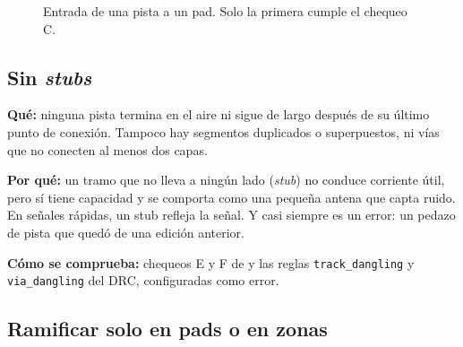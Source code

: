 \begin{figure}[htbp]
\centering
{}
\caption{Entrada de una pista a un pad. Solo la primera cumple el chequeo C.}
\label{fig:c09-entrada}
\end{figure}

\subsection{Sin \emph{stubs}}

\textbf{Qué:} ninguna pista termina en el aire ni sigue de largo después de su último punto de conexión. Tampoco hay
segmentos duplicados o superpuestos, ni vías que no conecten al menos dos capas.

\textbf{Por qué:} un tramo que no lleva a ningún lado (\emph{stub}) no conduce corriente útil, pero sí tiene capacidad y
se comporta como una pequeña antena que capta ruido. En señales rápidas, un stub refleja la señal. Y casi siempre es
un error: un pedazo de pista que quedó de una edición anterior.

\textbf{Cómo se comprueba:} chequeos E y F de  y las reglas \texttt{track\_dangling} y
\texttt{via\_dangling} del DRC, configuradas como error.

\subsection{Ramificar solo en pads o en zonas}

